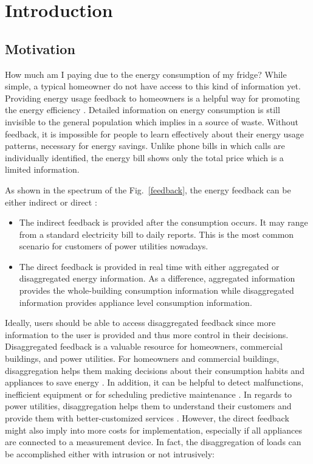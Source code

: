 \pagestyle{headings}

\chapter{Introduction}

\setcounter{page}{8}

\section{Motivation}

How much am I paying due to the energy consumption of my fridge? While simple, a typical homeowner do not have access to this kind of information yet. Providing energy usage feedback to homeowners is a helpful way for promoting the energy efficiency \cite{eci}. Detailed information on energy consumption is still invisible to the general population which implies in a source of waste. Without feedback, it is impossible for people to learn effectively about their energy usage patterns, necessary for energy savings. Unlike phone bills in which calls are individually identified, the energy bill shows only the total price which is a limited information. 

As shown in the spectrum of the Fig.~\ref{feedback}, the energy feedback can be either indirect or direct \cite{epri}: 

\begin{itemize}
\item The indirect feedback is provided after the consumption occurs. It may range from a standard electricity bill to daily reports. This is the most common scenario for customers of power utilities nowadays. 
\item The direct feedback is provided in real time with either aggregated or disaggregated energy information. As a difference, aggregated information provides the whole-building consumption information while disaggregated information provides appliance level consumption information.
\end{itemize}


Ideally, users should be able to access disaggregated feedback since more information to the user is provided and thus more control in their decisions. Disaggregated feedback is a valuable resource for homeowners, commercial buildings, and power utilities. For homeowners and commercial buildings, disaggregation helps them making decisions about their consumption habits and appliances to save energy \cite{CarrieArmel2013213}. In addition, it can be helpful to detect malfunctions, inefficient equipment or for scheduling predictive maintenance \cite{eunilm2016}. In regards to power utilities, disaggregation helps them to understand their customers and provide them with better-customized services \cite{eunilm2016-2}. However, the direct feedback might also imply into more costs for implementation, especially if all appliances are connected to a measurement device. In fact, the disaggregation of loads can be accomplished either with intrusion or not intrusively:

